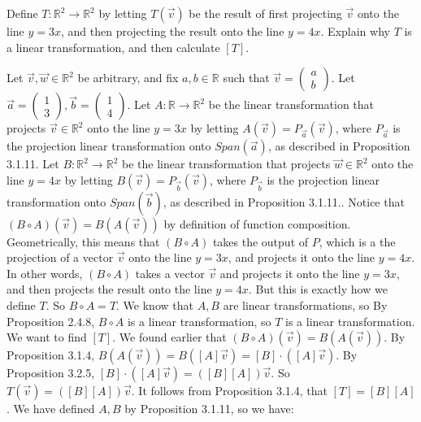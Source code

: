 \documentclass[12pt]{article}
\newenvironment{problem}[2][Problem]
{
	\begin{trivlist} 
		\item[\hskip \labelsep {\bfseries #1 #2:}]
	}
{
	\end{trivlist}
	}
\newenvironment{solution}[1][Solution]
{
	\begin{trivlist} 
		\item[\hskip \labelsep {\itshape #1:}]
	}
	{
	\end{trivlist}
}
\begin{document}
\begin{problem}{1}
Define $T:\mathbb{R}^2 \to \mathbb{R}^2$ by letting $T(\vec{v})$ be the result of first projecting $\vec{v}$ onto the line $y=3x$, and then projecting the result onto the line $y=4x$. Explain why $T$ is a linear transformation, and then calculate $[T]$.

\noindent
\newline
\newline
\begin{solution}
Let $\vec{v},\vec{w} \in \mathbb{R}^2$ be arbitrary, and fix $a,b \in \mathbb{R}$ such that $\vec{v}=\begin{pmatrix} a\\b\end{pmatrix}$. Let $\vec{a} = \begin{pmatrix} 1\\3 \end{pmatrix}, \vec{b}=\begin{pmatrix} 1\\4 \end{pmatrix}$. Let $A:\mathbb{R} \to \mathbb{R}^2$ be the linear transformation that projects $\vec{v} \in \mathbb{R}^2$ onto the line $y=3x$ by letting $A(\vec{v})=P_{\vec{a}}(\vec{v})$, where $P_{\vec{a}}$ is the projection linear transformation onto $Span(\vec{a})$, as described in Proposition 3.1.11. %
Let $B:\mathbb{R}^2 \to \mathbb{R}^2$ be the linear transformation that projects $\vec{w}\in \mathbb{R}^2$ onto the line $y=4x$ by letting $B(\vec{v})=P_{\vec{b}}(\vec{v})$, where $P_{\vec{b}}$ is the projection linear transformation onto $Span(\vec{b})$, as described in Proposition 3.1.11.. Notice that $(B\circ A)(\vec{v}) = B(A(\vec{v}))$ by definition of function composition. Geometrically, this means that $(B\circ A)$ takes the output of $P$, which is a the projection of a vector $\vec{v}$ onto the line $y=3x$, and projects it onto the line $y=4x$. In other words,  $(B\circ A)$ takes a vector $\vec{v}$ and projects it onto the line $y=3x$, and then projects the result onto the line $y=4x$. But this is exactly how we define $T$. So $B\circ A=T$. We know that $A,B$ are linear transformations, so By Proposition 2.4.8, $B\circ A$ is a linear transformation, so $T$ is a linear transformation. We want to find $[T]$. We found earlier that $(B\circ A)(\vec{v}) = B(A(\vec{v}))$. By Proposition 3.1.4, $B(A(\vec{v})) = B([A]\vec{v})=[B]\cdot([A]\vec{v})$. By Proposition 3.2.5, $[B]\cdot([A]\vec{v}) = ([B][A])\vec{v}$. So $T(\vec{v})=([B][A])\vec{v}$. It follows from Proposition 3.1.4, that $[T]=[B][A]$. We have defined $A,B$ by Proposition 3.1.11, so we have:

\end{solution}
\end{problem}
\end{document}
